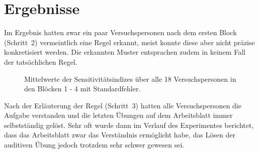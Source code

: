 \documentclass[doc,a4paper,12pt]{apa6}
\begin{document}
\section{Ergebnisse}

Im Ergebnis hatten zwar ein paar Versuchspersonen nach dem ersten Block (Schritt~2) vermeintlich eine Regel erkannt, meist konnte diese aber nicht präzise konkretisiert werden. Die erkannten Muster entsprachen zudem in keinem Fall der tatsächlichen Regel.

\begin{figure}[b]
  \centering
  \begin{minipage}{\textwidth}
    \vspace{10pt}
    \caption[Mittelwerte der Sensitivitätsindizes]{Mittelwerte der Sensitivitätsindizes über alle 18 Versuchspersonen in den Blöcken 1 - 4 mit Standardfehler.}
    \label{dprime}
  \end{minipage}
\end{figure}

Nach der Erläuterung der Regel (Schritt~3) hatten alle Versuchspersonen die Aufgabe verstanden und die letzten Übungen auf dem Arbeitsblatt immer selbstständig gelöst. Sehr oft wurde dann im Verlauf des Experimentes berichtet, dass das Arbeitsblatt zwar das Verständnis ermöglicht habe, das Lösen der auditiven Übung jedoch trotzdem sehr schwer gewesen sei.
\end{document}
